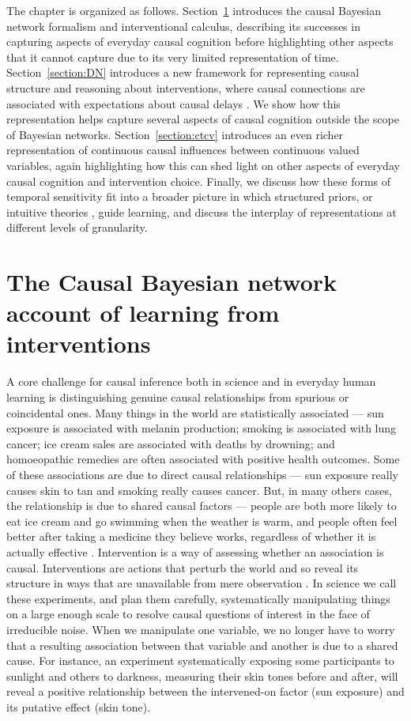 \documentclass{cambridge7A}%
\begin{document}
The chapter is organized as follows.  Section~\ref{section:CBN} introduces the causal Bayesian network formalism and interventional calculus, describing its successes in capturing  aspects of everyday causal cognition before highlighting other aspects that it cannot capture due to its very limited representation of time.  Section~\ref{section:DN} introduces a new framework for representing causal structure and reasoning about interventions, where causal connections are associated with expectations about causal delays \citep{bramley2018time}.  We show how this representation helps capture several aspects of causal cognition outside the scope of Bayesian networks.  Section~\ref{section:ctcv} introduces an even richer representation of continuous causal influences between continuous valued variables, again highlighting how this can shed light on other aspects of everyday causal cognition and intervention choice.  Finally, we discuss how these forms of temporal sensitivity fit into a broader picture in which structured priors, or intuitive theories \citep{gerstenberg2017intuitive}, guide learning, and discuss the interplay of representations at different levels of granularity.

\section{The Causal Bayesian network account of learning from interventions}\label{section:CBN}

A core challenge for causal inference both in science and in everyday human learning is distinguishing genuine causal relationships from spurious or coincidental ones.  Many things in the world are statistically associated --- sun exposure is associated with melanin production; smoking is associated with lung cancer; 
ice cream sales are associated with deaths by drowning; and homoeopathic remedies are often associated with positive health outcomes.  Some of these associations are due to direct causal relationships --- sun exposure really causes skin to tan and smoking really causes cancer. 
But, in many others cases, the relationship is due to shared causal factors --- people are both more likely to eat ice cream and go swimming when the weather is warm,  
and people often feel better after taking a medicine they believe works, regardless of whether it is actually effective \citep{di2001influence}.  Intervention is a way of assessing whether an association is causal.  Interventions are actions that perturb the world and so reveal its structure in ways that are unavailable from mere observation \citep{woodward2003making}.  In science we call these experiments, and plan them carefully, systematically manipulating things on a large enough scale to resolve causal questions of interest in the face of irreducible noise.  When we manipulate one variable, we no longer have to worry that a resulting association between that variable and another is due to a shared cause.  For instance, an experiment systematically exposing some participants to sunlight and others to darkness, measuring their skin tones before and after, will reveal a positive relationship between the intervened-on factor (sun exposure) and its putative effect (skin tone).
\end{document}
